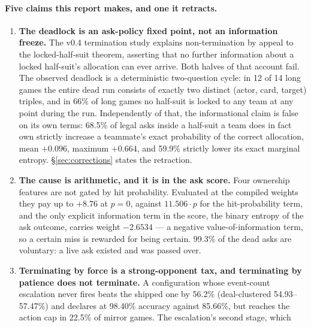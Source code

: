 \documentclass[11pt]{article}
\theoremstyle{definition}
\providecommand{\numPatientWin}{56.2}
\providecommand{\numPatientWinCI}{54.93--57.47}
\providecommand{\numPatientDeclAcc}{98.40}
\providecommand{\numForcingDeclAcc}{85.66}
\providecommand{\numPatientCap}{22.5}
\providecommand{\numLongGames}{14}
\providecommand{\numPureCycle}{12}
\providecommand{\numNoLockPct}{66}
\providecommand{\numCertRate}{68.5}
\providecommand{\numCertMean}{0.096}
\providecommand{\numCertMax}{0.664}
\providecommand{\numEntropyRate}{59.9}
\providecommand{\numHitWeight}{11.506}
\providecommand{\numOwnershipPay}{+8.76}
\providecommand{\numEntropyWeight}{-2.6534}
\providecommand{\numVoluntaryDead}{99.3}
\begin{document}
\paragraph{Five claims this report makes, and one it retracts.}

\begin{enumerate}
  \item \textbf{The deadlock is an ask-policy fixed point, not an information
        freeze.} The v0.4 termination study explains non-termination by appeal to
        the locked-half-suit theorem, asserting that no further information about
        a locked half-suit's allocation can ever arrive. Both halves of that
        account fail. The observed deadlock is a deterministic two-question
        cycle: in \numPureCycle{} of \numLongGames{} long games the entire dead
        run consists of exactly two distinct (actor, card, target) triples, and
        in \numNoLockPct\% of long games no half-suit is locked to any team at
        any point during the run. Independently of that, the informational claim
        is false on its own terms: \numCertRate\% of legal asks inside a
        half-suit a team does in fact own strictly increase a teammate's exact
        probability of the correct allocation, mean $+\numCertMean$, maximum
        $+\numCertMax$, and \numEntropyRate\% strictly lower its exact marginal
        entropy. \S\ref{sec:corrections} states the retraction.
  \item \textbf{The cause is arithmetic, and it is in the ask score.} Four
        ownership features are not gated by hit probability. Evaluated at the
        compiled weights they pay up to $\numOwnershipPay$ at $p=0$, against
        $\numHitWeight\cdot p$ for the hit-probability term, and the only
        explicit information term in the score, the binary entropy of the ask
        outcome, carries weight $\numEntropyWeight$ --- a negative
        value-of-information term, so a certain miss is rewarded for being
        certain. \numVoluntaryDead\% of the dead asks are voluntary: a live ask
        existed and was passed over.
  \item \textbf{Terminating by force is a strong-opponent tax, and terminating by
        patience does not terminate.} A configuration whose event-count
        escalation never fires beats the shipped one by \numPatientWin\%
        (deal-clustered \numPatientWinCI\%) and declares at \numPatientDeclAcc\%
        accuracy against \numForcingDeclAcc\%, but reaches the action cap in
        \numPatientCap\% of mirror games. The escalation's second stage, which

\end{enumerate}
\end{document}
